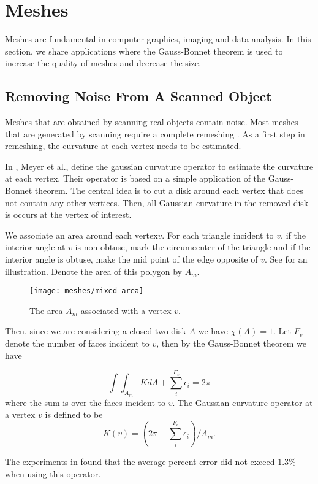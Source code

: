 \section{Meshes}
\label{sec:meshes}

Meshes are fundamental in computer graphics, imaging
and data analysis. In this section, we share applications
where the Gauss-Bonnet theorem is used to increase
the quality of meshes and decrease the size.


\subsection{Removing Noise From A Scanned Object}

Meshes that are obtained by scanning real objects contain noise.
Most meshes that are generated by scanning require a complete
remeshing \cite{remeshing-2003}.
As a first step in remeshing, the curvature at each
vertex needs to be estimated.

In \cite{mmsb-2003}, Meyer et al., define the gaussian curvature operator
to estimate the curvature at each vertex. Their operator is 
based on a simple application of the Gauss-Bonnet theorem.
The central idea is to cut a disk around each vertex that does not contain
any other vertices. Then, all Gaussian curvature in the removed
disk is occurs at the vertex of interest.

We associate an area around each vertex$v$. 
For each triangle incident to $v$, if the interior 
angle at $v$ is non-obtuse, mark the circumcenter of the triangle
and if the interior angle is obtuse, make the mid point of the edge
opposite of $v$. See  for an illustration.
Denote the area of this polygon by $A_m.$


\begin{figure}[htb]
\centering
\texttt{[image: meshes/mixed-area]}
\caption{The area $A_m$ associated with a vertex $v$.}
\label{fig:mixed-area}
\end{figure}


Then, since we are considering a closed two-disk $A$ we have $\chi(A)=1$.
Let $F_v$ denote the number of faces incident to $v$, 
then by the Gauss-Bonnet theorem we have

$$\int \int_{A_m}K dA +\sum_i^{F_v} \epsilon_i=2\pi$$
where the sum is over the faces incident to $v$.
The Gaussian curvature operator at a vertex $v$ is defined
to be
$$K(v)=\left( 2\pi -\sum_i^{F_v}\epsilon_i\right)/ A_m.$$

The experiments in \cite{mmsb-2003} found that the average
percent error did not exceed $1.3\%$ when using this operator.

